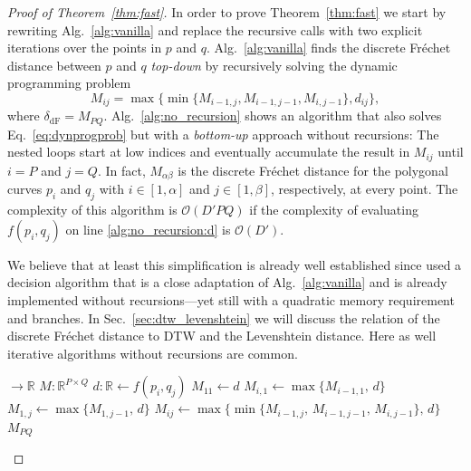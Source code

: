 \begin{proof}[Proof of Theorem~\ref{thm:fast}]
In order to prove Theorem~\ref{thm:fast} we start by rewriting Alg.~\ref{alg:vanilla} and replace the recursive calls with two explicit iterations over the points in $p$ and $q$.
Alg.~\ref{alg:vanilla} finds the discrete Fr\'echet distance between $p$ and $q$ \textit{top-down} by recursively solving the dynamic programming problem
\begin{equation}
    \label{eq:dynprogprob}
    M_{ij} = \max\{ \min\{ M_{i-1,j}, M_{i-1,j-1}, M_{i,j-1} \}, d_{ij} \},
\end{equation}
where $\delta_\mathrm{dF} = M_{PQ}$.
Alg.~\ref{alg:no_recursion} shows an algorithm that also solves Eq.~\eqref{eq:dynprogprob} but with a \textit{bottom-up} approach without recursions:
The nested loops start at low indices and eventually accumulate the result in $M_{ij}$ until $i=P$ and $j=Q$.
In fact, $M_{\alpha \beta}$ is the discrete Fr\'echet distance for the polygonal curves $p_i$ and $q_j$ with $i \in [1, \alpha]$ and $j \in [1, \beta]$, respectively, at every point.
The complexity of this algorithm is $\mathcal{O}(D'PQ)$ if the complexity of evaluating $f(p_i, q_j)$ on line \ref{alg:no_recursion:d} is $\mathcal{O}(D')$.

We believe that at least this simplification is already well established since \citet{ahn10} used a decision algorithm that is a close adaptation of Alg.~\ref{alg:vanilla} and is already implemented without recursions---yet still with a quadratic memory requirement and branches.
In Sec.~\ref{sec:dtw_levenshtein} we will discuss the relation of the discrete Fr\'echet distance to DTW and the Levenshtein distance.
Here as well iterative algorithms without recursions are common.

\begin{algorithm}
    \caption{Variant of Alg.~\ref{alg:vanilla} without recursions.}
    \label{alg:no_recursion}
    \begin{algorithmic}[1]
         $\to \mathbb{R}$
            \State $M: \mathbb{R}^{P \times Q}$
            \Statex
                    \State $d: \mathbb{R} \gets f(p_i, q_j)$ \label{alg:no_recursion:d}
                    \Statex
                        \State $M_{11} \gets d$
                        \State $M_{i,1} \gets \max\{M_{i-1,1},\, d \}$
                        \State $M_{1,j} \gets \max\{M_{1,j-1},\, d \}$
                    \Else
                        \State $M_{ij} \gets \max\{\min\{M_{i-1,j},\, M_{i-1,j-1},\, M_{i,j-1}\},\, d \}$
                    \EndIf
                \EndFor
            \EndFor
            \Statex
            \State \Return $M_{PQ}$   
        \EndFunction
    \end{algorithmic}
\end{algorithm}


\end{proof}
